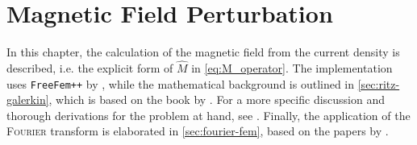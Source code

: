 \section{Magnetic Field Perturbation}
\label{sec:compute_Bn}

In this chapter, the calculation of the magnetic field from the current density is described, i.e. the explicit form of $\hat{M}$ in \cref{eq:M_operator}. The implementation uses \texttt{FreeFem++} by \textcite{Hecht12}, while the mathematical background is outlined in \cref{sec:ritz-galerkin}, which is based on the book by \textcite{Jin02}. For a more specific discussion and thorough derivations for the problem at hand, see \textcite{Seeber18}. Finally, the application of the \textsc{Fourier} transform is elaborated in \cref{sec:fourier-fem}, based on the papers by \textcite{Heyn08,Albert16}.

